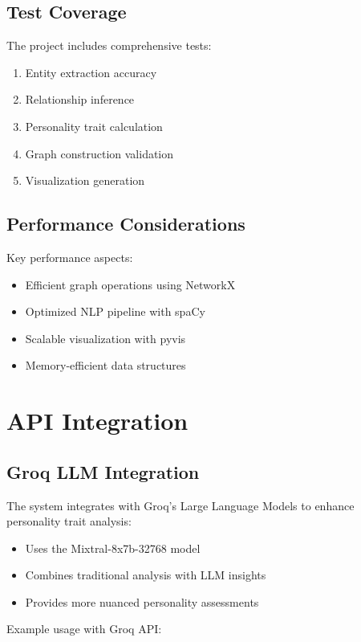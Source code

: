 \documentclass[11pt]{article}
\begin{document}
\subsection{Test Coverage}
The project includes comprehensive tests:

\begin{enumerate}
    \item Entity extraction accuracy
    \item Relationship inference
    \item Personality trait calculation
    \item Graph construction validation
    \item Visualization generation
\end{enumerate}

\subsection{Performance Considerations}
Key performance aspects:

\begin{itemize}
    \item Efficient graph operations using NetworkX
    \item Optimized NLP pipeline with spaCy
    \item Scalable visualization with pyvis
    \item Memory-efficient data structures
\end{itemize}

\section{API Integration}

\subsection{Groq LLM Integration}
The system integrates with Groq's Large Language Models to enhance personality trait analysis:

\begin{itemize}
    \item Uses the Mixtral-8x7b-32768 model
    \item Combines traditional analysis with LLM insights
    \item Provides more nuanced personality assessments
\end{itemize}

Example usage with Groq API:
\end{document}

